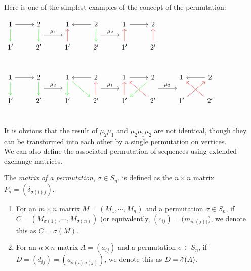 \indent Here is one of the simplest examples of the concept of the permutation:\\
\begin{example}
$\begin{tikzcd}
1 \arrow[r] \arrow[d,green] & 2\arrow [d,green]\arrow[r,"\mu_1", shift right=3.5ex]  & 1&2\arrow[l]\arrow[d,green]\arrow[r,"\mu_2", shift right=3.5ex]&1\arrow[r] & 2\\
1' & 2'&1'\arrow[u,red]& 2'&1'\arrow[u,red] & 2'\arrow[u,red]\\
\end{tikzcd}$
\end{example}
\begin{example}
$\begin{tikzcd}
 1 \arrow[r] \arrow[d,green] & 2\arrow [d,green]\arrow[r,"\mu_2", shift right=3.5ex] & 1\arrow[dr,green]\arrow[d,green]&2\arrow[l]\arrow[r,"\mu_1", shift right=3.5ex]&1\arrow[r]&2\arrow[dl,green]\arrow[r,"\mu_2", shift right=3.5ex]&1&2\arrow[l]\\
 1' & 2'& 1'&2'\arrow[u,red]&1'\arrow[u,red]&2'\arrow[ul,red]&1'\arrow[ur,red]&2'\arrow[ul,red]\\
\end{tikzcd}$\\
\end{example}
\indent It is obvious that the result of $\mu_2\mu_1$ and $\mu_2\mu_1\mu_2$ are not identical, though they can be transformed into each other by a single permutation on vertices.\\
\indent We can also define the associated permutation of sequences using extended exchange matrices.\\
\begin{definition}
The \textit{matrix of a permutation}, $\sigma\in S_n$, is defined as the $n\times n$ matrix $P_\sigma=(\delta_{\sigma(i)j})$.\\
\end{definition}
\begin{definition}
\begin{enumerate}
\item For an $m\times n$ matrix $M=(M_1,\cdots, M_n)$ and a permutation $\sigma\in S_n$, if $C=(M_{\sigma(1)},\cdots,M_{\sigma(n)})$ (or equivalently, $(c_{ij})=(m_{i\sigma(j))}$), we denote this as $C=\sigma(M)$.
\item For an $n\times n$ matrix $A=(a_{ij})$ and a permutation $\sigma\in S_n$, if $D=(d_{ij})=(a_{\sigma(i)\sigma(j)})$, we denote this as $D=\tilde{\sigma}(A)$.
\end{enumerate}
\end{definition}
